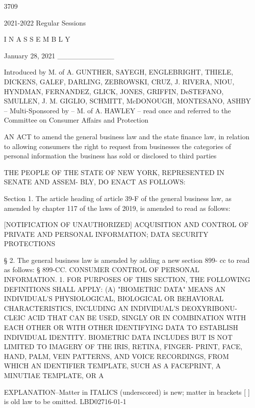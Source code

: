  3709
 
                        2021-2022 Regular Sessions
 
                           I N  A S S E M B L Y
 
                             January 28, 2021
                                ___________
 
 Introduced  by  M.  of A. GUNTHER, SAYEGH, ENGLEBRIGHT, THIELE, DICKENS,
   GALEF, DARLING, ZEBROWSKI, CRUZ, J. RIVERA, NIOU, HYNDMAN,  FERNANDEZ,
   GLICK,  JONES,  GRIFFIN,  DeSTEFANO,  SMULLEN,  J. M. GIGLIO, SCHMITT,
   McDONOUGH, MONTESANO, ASHBY -- Multi-Sponsored by -- M. of  A.  HAWLEY
   --  read  once  and  referred to the Committee on Consumer Affairs and
   Protection
 
 AN ACT to amend the general business law and the state finance  law,  in
   relation  to  allowing  consumers the right to request from businesses
   the categories of  personal  information  the  business  has  sold  or
   disclosed to third parties
 
   THE  PEOPLE OF THE STATE OF NEW YORK, REPRESENTED IN SENATE AND ASSEM-
 BLY, DO ENACT AS FOLLOWS:
 
   Section 1. The article heading of article 39-F of the general business
 law, as amended by chapter 117 of the laws of 2019, is amended  to  read
 as follows:
 
          [NOTIFICATION OF UNAUTHORIZED] ACQUISITION AND CONTROL
            OF PRIVATE AND PERSONAL INFORMATION; DATA SECURITY
                                PROTECTIONS
 
   §  2. The general business law is amended by adding a new section 899-
 cc to read as follows:
   § 899-CC. CONSUMER CONTROL OF PERSONAL INFORMATION. 1. FOR PURPOSES OF
 THIS SECTION, THE FOLLOWING DEFINITIONS SHALL APPLY:
   (A) "BIOMETRIC DATA" MEANS AN INDIVIDUAL'S  PHYSIOLOGICAL,  BIOLOGICAL
 OR  BEHAVIORAL  CHARACTERISTICS,  INCLUDING AN INDIVIDUAL'S DEOXYRIBONU-
 CLEIC ACID THAT CAN BE USED, SINGLY OR IN COMBINATION WITH EACH OTHER OR
 WITH OTHER IDENTIFYING DATA TO ESTABLISH INDIVIDUAL IDENTITY.  BIOMETRIC
 DATA INCLUDES BUT IS NOT LIMITED TO IMAGERY OF THE IRIS, RETINA, FINGER-
 PRINT, FACE, HAND, PALM, VEIN PATTERNS, AND VOICE RECORDINGS, FROM WHICH
 AN  IDENTIFIER  TEMPLATE, SUCH AS A FACEPRINT, A MINUTIAE TEMPLATE, OR A
 
  EXPLANATION--Matter in ITALICS (underscored) is new; matter in brackets
                       [ ] is old law to be omitted.
                                                            LBD02716-01-1

